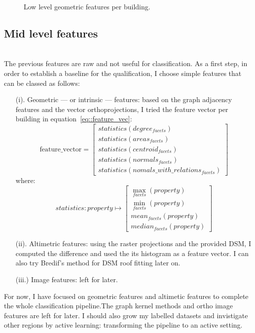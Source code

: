 \documentclass[../main.tex]{subfiles}
\begin{document}
	\begin{figure}[H]
		
		\caption{\label{fig::geom_features} Low level geometric features per building.}
	\end{figure}
	\clearpage

	\subsection{Mid level features}
~\\

	The previous features are raw and not useful for classification. As a first
	step, in order to establish a baseline for the qualification, I choose simple
	features that can be classed as follows:
	\begin{itemize}
		\item[(i).] Geometric --- or intrinsic --- features: based on the graph adjacency features and the vector orthoprojections, I tried the feature vector per building in equation~\ref{eq::feature_vec}:
		\begin{equation}\label{eq::feature_vec}
			\text{feature\_vector} = \begin{bmatrix}
				statistics(degree_{facets})\\
				statistics(areas_{facets})\\
				statistics(centroid_{facets})\\
				statistics(normals_{facets})\\
				statistics(nomals\_with\_relations_{facets})
		\end{bmatrix}
		\end{equation}
		where:
		\begin{equation}
			statistics: property \mapsto \begin{bmatrix}
			\max_{facets}(property)\\
			\min_{facets}(property)\\
			mean_{facets}(property)\\
			median_{facets}(property)
		\end{bmatrix}
		\end{equation}
		\item[(ii).] Altimetric features: using the raster projections and the provided DSM, I computed the difference and used the its histogram as a feature vector. I can also try Bredif's method for DSM roof fitting later on.
		\item[(iii.)] Image features: left for later.
	\end{itemize}

	For now, I have focused on geometric features and altimetic features to complete the whole classification pipeline.The graph kernel methods and ortho image features are left for later. I should also grow my labelled datasets and invistigate other regions by active learning: transforming the pipeline to an active setting.
\end{document}
